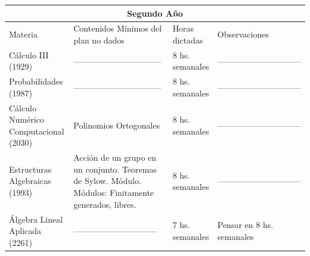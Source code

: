 \documentclass[a4paper,10pt,BCOR10mm,oneside,headsepline]{scrbook}
\begin{document}
\begin{subappendices}
\begin{tabular}{|p{3cm}|p{4cm}|p{2cm}|p{2cm}|}
\hline
\multicolumn{4}{|c|}{Segundo Año}\\ \hline
Materia                               & Contenidos Mínimos del plan no dados                                                                  & Horas dictadas  & Observaciones                  \\ \hline
Cálculo III (1929)                    & --------------------------------                                                                      & 8 hs. semanales & ------------------------------ \\ \hline
Probabilidades (1987)                 & --------------------------------                                                                      & 8 hs. semanales & ------------------------------ \\ \hline
Cálculo Numérico Computacional (2030) & Polinomios Ortogonales                                                                                & 8 hs. semanales & ------------------------------ \\ \hline
Estructuras Algebraicas (1993)        & Acción de un grupo en un conjunto. Teoremas de Sylow. Módulo. Módulos: Finitamente generados, libres. & 8 hs. semanales & ------------------------------ \\ \hline
Álgebra Lineal Aplicada (2261)        & ------------------------------                                                                        & 7 hs. semanales & Pensar en 8 hs. semanales      \\ \hline

\end{tabular}




\end{subappendices}
\end{document}
